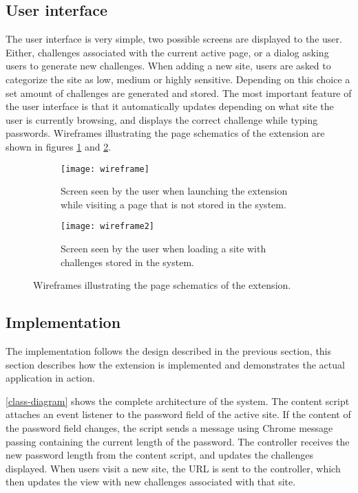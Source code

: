 \subsection{User interface}
The user interface is very simple, two possible screens are displayed to the user. Either, challenges associated with the current active page, or a dialog asking users to generate new challenges. When adding a new site, users are asked to categorize the site as low, medium or highly sensitive. Depending on this choice a set amount of challenges are generated and stored. The most important feature of the user interface is that it automatically updates depending on what site the user is currently browsing, and displays the correct challenge while typing passwords. Wireframes illustrating the page schematics of the extension are shown in figures \ref{add-new-screen} and \ref{challenge-screen}. 

\begin{figure}[ht]
    \centering
    \begin{subfigure}[t]{0.45\textwidth}
        \centering
        \texttt{[image: wireframe]} 
        \caption{Screen seen by the user when launching the extension while visiting a page that is not stored in the system.}
        \label{add-new-screen}
    \end{subfigure}
    \hfill
    \begin{subfigure}[t]{0.45\textwidth}
        \centering
        \texttt{[image: wireframe2]} 
        \caption{Screen seen by the user when loading a site with challenges stored in the system. }
        \label{challenge-screen}
    \end{subfigure}
    \caption{Wireframes illustrating the page schematics of the extension.}
    \label{wireframes}
\end{figure}

\subsection{Implementation}
The implementation follows the design described in the previous section, this section describes how the extension is implemented and demonstrates the actual application in action. 


\par \autoref{class-diagram} shows the complete architecture of the system.
 The content script attaches an event listener to the password field of the active site. If the content of the password field changes, the script sends a message using Chrome message passing containing the current length of the password. The controller receives the new password length from the content script, and updates the challenges displayed. When users visit a new site, the URL is sent to the controller, which then updates the view with new challenges associated with that site.

